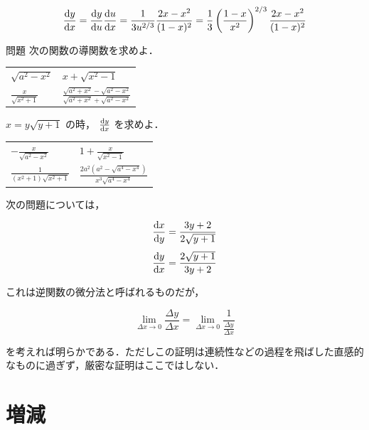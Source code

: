 \documentclass[
  b4paperpaper,
  xelatex,ja=standard]{bxjsbook}
\begin{document}
\[\dv{y}{x}=\dv{y}{u}\dv{u}{x}=\frac{1}{3u^{2/3}}\frac{2x-x^2}{(1-x)^2}=\frac{1}{3}\left(\frac{1-x}{x^2}\right)^{2/3}\frac{2x-x^2}{(1-x)^2}\]

\begin{Qbox}{問題}
次の関数の導関数を求めよ．

\begin{longtable}[]{@{}
  >{\raggedright\arraybackslash}p{}
  >{\raggedright\arraybackslash}p{}@{}}
\toprule\noalign{}
\endhead
\bottomrule\noalign{}
\endlastfoot
\(\sqrt{a^2-x^2}\) & \(x+\sqrt{x^2-1}\) \\
\(\frac{x}{\sqrt{x^2+1}}\) &
\(\frac{\sqrt{a^2+x^2}-\sqrt{a^2-x^2}}{\sqrt{a^2+x^2}+\sqrt{a^2-x^2}}\) \\
\end{longtable}

\(x=y\sqrt{y+1}\) の時， \(\dv{y}{x}\) を求めよ．

\end{Qbox}


\begin{longtable}[]{@{}
  >{\raggedright\arraybackslash}p{}
  >{\raggedright\arraybackslash}p{}@{}}
\toprule\noalign{}
\endhead
\bottomrule\noalign{}
\endlastfoot
\(-\frac{x}{\sqrt{a^2-x^2}}\) & \(1+\frac{x}{\sqrt{x^2-1}}\) \\
\(\frac{1}{(x^2+1)\sqrt{x^2+1}}\) &
\(\frac{2a^2(a^2-\sqrt{a^4-x^4})}{x^3\sqrt{a^4-x^4}}\) \\
\end{longtable}

次の問題については，

\[\dv{x}{y}=\frac{3y+2}{2\sqrt{y+1}}\]
\[\dv{y}{x}=\frac{2\sqrt{y+1}}{3y+2}\]

これは逆関数の微分法と呼ばれるものだが，

\[\lim_{\Delta x \to 0}\frac{\Delta y}{\Delta x}=\lim_{\Delta x \to 0}\frac{1}{\frac{\Delta y}{\Delta x}}\]

を考えれば明らかである．ただしこの証明は連続性などの過程を飛ばした直感的なものに過ぎず，厳密な証明はここではしない．

\hypertarget{ux5897ux6e1b}{%
\section{増減}\label{ux5897ux6e1b}}
\end{document}
